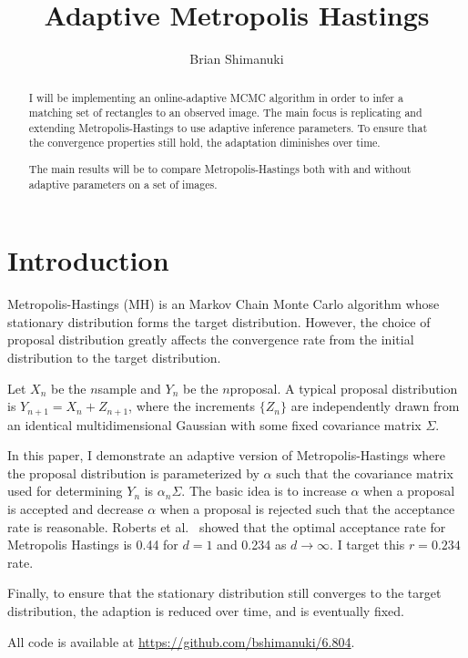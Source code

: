 \documentclass[11pt]{article}
\title{Adaptive Metropolis Hastings}
\author{Brian Shimanuki}
\begin{document}
\maketitle

\begin{abstract}

I will be implementing an online-adaptive MCMC algorithm in order to infer a matching set of rectangles to an observed image. The main focus is replicating \cite{dippl} and extending Metropolis-Hastings to use adaptive inference parameters. To ensure that the convergence properties still hold, the adaptation diminishes over time.

The main results will be to compare Metropolis-Hastings both with and without adaptive parameters on a set of images.

\end{abstract}

\section{Introduction}
Metropolis-Hastings\cite{metropolis,hastings} (MH) is an Markov Chain Monte Carlo algorithm whose stationary distribution forms the target distribution. However, the choice of proposal distribution greatly affects the convergence rate from the initial distribution to the target distribution.

Let $X_n$ be the $n$\th sample and $Y_n$ be the $n$\th proposal. A typical proposal distribution is $Y_{n+1}=X_{n}+Z_{n+1}$, where the increments $\{Z_n\}$ are independently drawn from an identical multidimensional Gaussian with some fixed covariance matrix $\Sigma$.

In this paper, I demonstrate an adaptive version of Metropolis-Hastings where the proposal distribution is parameterized by $\alpha$ such that the covariance matrix used for determining $Y_n$ is $\alpha_n\Sigma$. The basic idea is to increase $\alpha$ when a proposal is accepted and decrease $\alpha$ when a proposal is rejected such that the acceptance rate is reasonable. Roberts et al.\ \cite{roberts} showed that the optimal acceptance rate for Metropolis Hastings is 0.44 for $d=1$ and 0.234 as $d\to\infty$. I target this $r=0.234$ rate.

Finally, to ensure that the stationary distribution still converges to the target distribution, the adaption is reduced over time, and is eventually fixed.

All code is available at \url{https://github.com/bshimanuki/6.804}.
\end{document}
